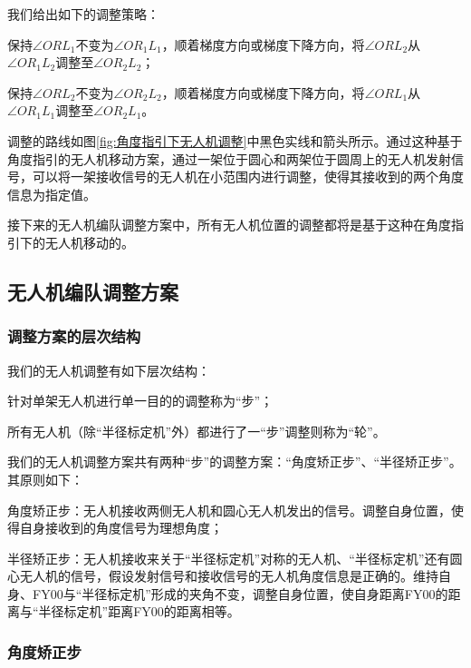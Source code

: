 \documentclass[12pt,AutoFakeSlant,AutoFakeBold]{article}
\begin{document}
我们给出如下的调整策略：
\begin{enumerate*}
    \item 保持$\angle ORL_1$不变为$\angle OR_1L_1$，顺着梯度方向或梯度下降方向，将$\angle ORL_2$从$\angle OR_1L_2$调整至$\angle OR_2L_2$；
    \item 保持$\angle ORL_2$不变为$\angle OR_2L_2$，顺着梯度方向或梯度下降方向，将$\angle ORL_1$从$\angle OR_1L_1$调整至$\angle OR_2L_1$。
\end{enumerate*}

调整的路线如图\ref{fig:角度指引下无人机调整}中黑色实线和箭头所示。通过这种基于角度指引的无人机移动方案，通过一架位于圆心和两架位于圆周上的无人机发射信号，可以将一架接收信号的无人机在小范围内进行调整，使得其接收到的两个角度信息为指定值。

接下来的无人机编队调整方案中，所有无人机位置的调整都将是基于这种在角度指引下的无人机移动的。

\subsection{无人机编队调整方案}

\subsubsection{调整方案的层次结构}

我们的无人机调整有如下层次结构：
\begin{itemize*}
    \item 针对单架无人机进行单一目的的调整称为“步”；
    \item 所有无人机（除“半径标定机”外）都进行了一“步”调整则称为“轮”。
\end{itemize*}

我们的无人机调整方案共有两种“步”的调整方案：“角度矫正步”、“半径矫正步”。其原则如下：
\begin{itemize*}
    \item 角度矫正步：无人机接收两侧无人机和圆心无人机发出的信号。调整自身位置，使得自身接收到的角度信号为理想角度；
    \item 半径矫正步：无人机接收来关于“半径标定机”对称的无人机、“半径标定机”还有圆心无人机的信号，假设发射信号和接收信号的无人机角度信息是正确的。维持自身、FY00与“半径标定机”形成的夹角不变，调整自身位置，使自身距离FY00的距离与“半径标定机”距离FY00的距离相等。
\end{itemize*}

\subsubsection{角度矫正步}
\end{document}
